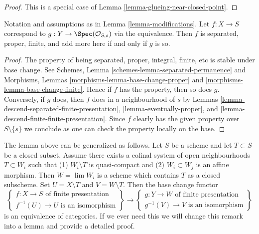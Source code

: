 \begin{proof}
This is a special case of Lemma \ref{lemma-glueing-near-closed-point}.
\end{proof}

\begin{lemma}
\label{lemma-modifications-properties}
Notation and assumptions as in Lemma \ref{lemma-modifications}.
Let $f : X \to S$ correspond to $g : Y \to \Spec(\mathcal{O}_{S, s})$
via the equivalence. Then $f$ is separated, proper, finite,
and add more here if and only if $g$ is so.
\end{lemma}

\begin{proof}
The property of being separated, proper, integral, finite, etc
is stable under base change. See
Schemes, Lemma \ref{schemes-lemma-separated-permanence}
and
Morphisms, Lemmas \ref{morphisms-lemma-base-change-proper} and
\ref{morphisms-lemma-base-change-finite}.
Hence if $f$ has the property, then so does $g$.
Conversely, if $g$ does, then $f$ does in a neighbourhood of $s$ by
Lemmas \ref{lemma-descend-separated-finite-presentation},
\ref{lemma-eventually-proper}, and
\ref{lemma-descend-finite-finite-presentation}.
Since $f$ clearly has the given property over $S \setminus \{s\}$
we conclude as one can check the property locally on the base.
\end{proof}

\begin{remark}
\label{remark-more-general-modification}
The lemma above can be generalized as follows. Let $S$ be a scheme and
let $T \subset S$ be a closed subset. Assume there exists a cofinal
system of open neighbourhoods $T \subset W_i$ such that
(1) $W_i \setminus T$ is quasi-compact and
(2) $W_i \subset W_j$ is an affine morphism.
Then $W = \lim W_i$ is a scheme which contains $T$
as a closed subscheme. Set $U = X \setminus T$ and $V = W \setminus T$.
Then the base change functor
$$
\left\{
\begin{matrix}
f : X \to S\text{ of finite presentation} \\
f^{-1}(U) \to U\text{ is an isomorphism}
\end{matrix}
\right\}
\longrightarrow
\left\{
\begin{matrix}
g : Y \to W\text{ of finite presentation} \\
g^{-1}(V) \to V\text{ is an isomorphism}
\end{matrix}
\right\}
$$
is an equivalence of categories. If we ever need this we will
change this remark into a lemma and provide a detailed proof.
\end{remark}



